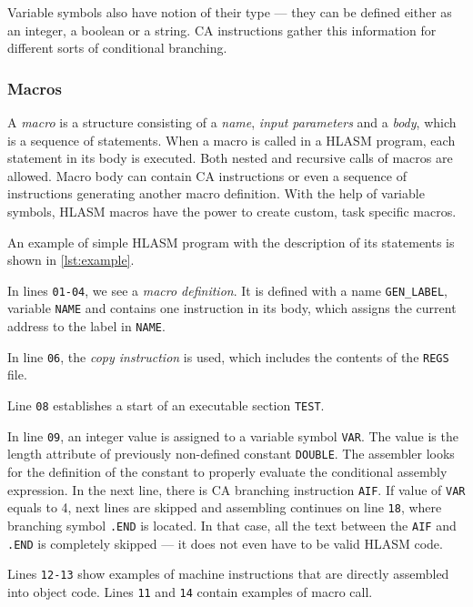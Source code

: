 Variable symbols also have notion of their type --- they can be defined either as an integer, a boolean or a string. CA instructions gather this information for different sorts of conditional branching.

\subsubsection{Macros}

A \emph{macro} is a structure consisting of a \emph{name}, \emph{input parameters} and a \emph{body}, which is a sequence of statements. When a macro is called in a HLASM program, each statement in its body is executed. Both nested and recursive calls of macros are allowed. Macro body can contain CA instructions or even a sequence of instructions generating another macro definition. With the help of variable symbols, HLASM macros have the power to create custom, task specific macros.

\vspace{5mm}

An example of simple HLASM program with the description of its statements is shown in \cref{lst:example}.

In lines \verb|01-04|, we see a \emph{macro definition}. It is defined with a name \verb|GEN_LABEL|, variable \verb|NAME| and contains one instruction in its body, which assigns the current address to the label in \verb|NAME|.

In line \verb|06|, the \emph{copy instruction} is used, which includes the contents of the \verb|REGS| file.

Line \verb|08| establishes a start of an executable section \verb|TEST|. 

In line \verb|09|, an integer value is assigned to a variable symbol \verb|VAR|. The value is the length attribute of previously non-defined constant \verb|DOUBLE|. The assembler looks for the definition of the constant to properly evaluate the conditional assembly expression. In the next line, there is CA branching instruction \verb|AIF|. If value of \verb|VAR| equals to 4, next lines are skipped and assembling continues on line \verb|18|, where branching symbol \verb|.END| is located. In that case, all the text between the \verb|AIF| and \verb|.END| is completely skipped --- it does not even have to be valid HLASM code.

Lines \verb|12-13| show examples of machine instructions that are directly assembled into object code. Lines \verb|11| and \verb|14| contain examples of macro call.

